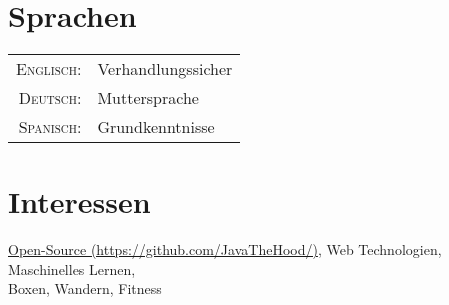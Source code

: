 \documentclass[a4paper,10pt]{article} %
\begin{document}
\section{Sprachen}
 
\begin{tabular}{rl}
\textsc{Englisch:} & Verhandlungssicher\\
 
\textsc{Deutsch:} & Muttersprache\\
 
\textsc{Spanisch:} & Grundkenntnisse\\
\end{tabular}
 
 
 
\section{Interessen}
 
\href{https://github.com/JavaTheHood}{Open-Source (\faGithub https://github.com/JavaTheHood/)}, Web Technologien, Maschinelles Lernen, \\
Boxen, Wandern, Fitness
 
 
\newpage
 
\end{document}
